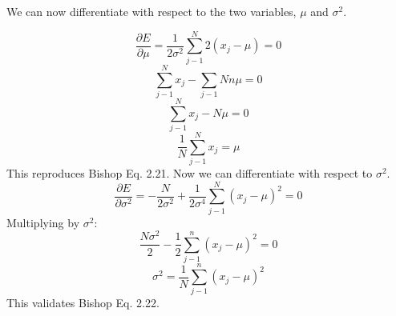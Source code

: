 \documentclass[12pt, letterpaper]{article}
\begin{document}
We can now differentiate with respect to the two variables, $\mu$ and $\sigma^2$. 

\begin{equation}
\frac{\partial E}{\partial \mu} = \frac{1}{2 \sigma^2} \sum_{j-1}^N 2 (x_j - \mu) = 0 
\end{equation}
\begin{equation}
\sum_{j-1}^N x_j - \sum_{j-1}Nn \mu = 0
\end{equation}
\begin{equation}
\sum_{j-1}^N x_j - N \mu = 0
\end{equation}
\begin{equation}
\frac{1}{N}\sum_{j-1}^N x_j  = \mu
\end{equation}
This reproduces Bishop Eq. 2.21. Now we can differentiate with respect to $\sigma^2$.  
\begin{equation}
\frac{\partial E}{\partial \sigma^2} = -\frac{N}{2 \sigma^2} + \frac{1}{2 \sigma^4} \sum_{j-1}^N (x_j - \mu)^2 = 0 
\end{equation}
Multiplying by $\sigma^2$:
\begin{equation}
\frac{N \sigma^2}{2} - \frac{1}{2} \sum_{j-1}^n (x_j - \mu)^2 = 0 
\end{equation}
\begin{equation}
\sigma^2 = \frac{1}{N} \sum_{j-1}^n (x_j - \mu)^2
\end{equation}
This validates Bishop Eq. 2.22.
\end{document}
